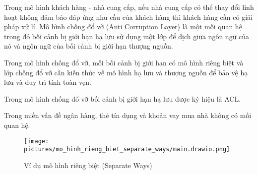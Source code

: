 
Trong mô hình khách hàng - nhà cung cấp, nếu nhà cung cấp có thể thay đổi linh hoạt không đảm bảo đáp ứng nhu cầu của khách hàng thì khách hàng cần có giải pháp xử lí. Mô hình chống đổ vỡ (Anti Corruption Layer) là một mối quan hệ trong đó bối cảnh bị giới hạn hạ lưu sử dụng một lớp để dịch giữa ngôn ngữ của nó và ngôn ngữ của bối cảnh bị giới hạn thượng nguồn.

Trong mô hình chống đổ vỡ, mỗi bối cảnh bị giới hạn có mô hình riêng biệt và lớp chống đổ vỡ cần kiến thức về mô hình hạ lưu và thượng nguồn để bảo vệ hạ lưu và duy trì tính toàn vẹn.



Trong mô hình chống đổ vỡ bối cảnh bị giới hạn hạ lưu được ký hiệu là ACL.



















\begin{example} Trong miền vấn đề ngân hàng, thẻ tín dụng và khoản vay mua nhà không có mối quan hệ.

    \begin{figure}[H]

        \centering

        \texttt{[image: pictures/mo\_hinh\_rieng\_biet\_separate\_ways/main.drawio.png]}

        \caption{Ví dụ mô hình riêng biệt (Separate Ways)}

    \end{figure}

\end{example}

